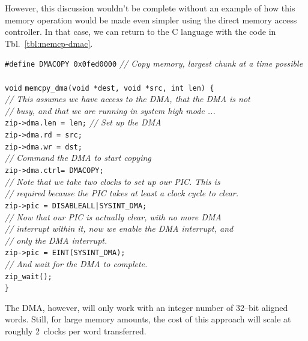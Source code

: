 \documentclass{gqtekspec}
\begin{document}
However, this discussion wouldn't be complete without an example of how
this memory operation would be made even simpler using the direct memory
access controller.  In that case, we can return to the C language with the
code in Tbl.~\ref{tbl:memcp-dmac}.
\begin{table}\begin{center}
\begin{tabbing}
{\tt \#define DMACOPY 0x0fed0000} {\em // Copy memory, largest chunk at a time possible} \\
\\
{\tt void} \= {\tt memcpy\_dma(void *dest, void *src, int len) \{} \\
	\> {\em // This assumes we have access to the DMA, that the DMA is not}\\
	\> {\em // busy, and that we are running in system high mode ...}\\
	\> {\tt zip->dma.len = len;} \= {\em // Set up the DMA }\\
	\> {\tt zip->dma.rd  = src;}\\
	\> {\tt zip->dma.wr  = dst;}\\
	\> {\em // Command the DMA to start copying} \\
	\> {\tt zip->dma.ctrl= DMACOPY;} \\
	\> {\em // Note that we take two clocks to set up our PIC.  This is }\\
	\> {\em // required because the PIC takes at least a clock cycle to clear.} \\
	\> {\tt zip->pic = DISABLEALL|SYSINT\_DMA;} \\
	\> {\em // Now that our PIC is actually clear, with no more DMA }\\
	\> {\em // interrupt within it, now we enable the DMA interrupt, and}\\
	\> {\em // only the DMA interrupt.}\\
	\> {\tt zip->pic = EINT(SYSINT\_DMA);}\\
	\> {\em // And wait for the DMA to complete.} \\
	\> {\tt zip\_wait();}\\
{\tt \}}
\end{tabbing}
\caption{Example Memory Copy code using the DMA}\label{tbl:memcp-dmac}
\end{center}\end{table}
The DMA, however, will only work with an integer number of 32--bit aligned
words.  Still, for large memory amounts, the cost of this approach will scale
at roughly 2~clocks per word transferred.
\end{document}
